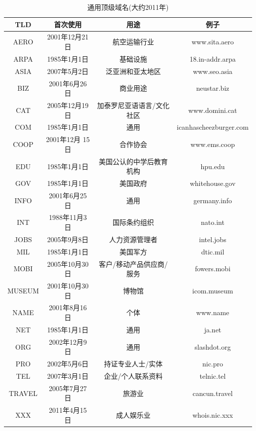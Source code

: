 \begin{table}[]
	\centering
	\caption{通用顶级域名(大约2011年)}
	\begin{tabular}{c|c|c|c}
		\hline
        TLD	    & 首次使用	    &     用途	          &              例子 \\ \hline
        AERO	& 2001年12月21日	& 航空运输行业	       &     www.sita.aero \\ \hline
        ARPA	& 1985年1月1日	& 基础设施	           &     18.in-addr.arpa \\ \hline
        ASIA	& 2007年5月2日	& 泛亚洲和亚太地区	       & www.seo.asia \\ \hline
        BIZ	    & 2001年6月26日	& 商业用途	          &      neustar.biz \\ \hline
        CAT	    & 2005年12月19日	& 加泰罗尼亚语语言/文化社区	&www.domini.cat \\ \hline
        COM	    & 1985年1月1日	& 通用	             &   icanhascheezburger.com \\ \hline
        COOP	& 2001年12月 15日	& 合作协会	        &        www.ems.coop \\ \hline
        EDU	    & 1985年1月1日	& 美国公认的中学后教育机构	   & hpu.edu \\ \hline
        GOV	    & 1985年1月1日	& 美国政府	           &     whitehouse.gov \\ \hline
        INFO	& 2001年6月25日	& 通用	            &        germany.info \\ \hline
        INT	    & 1988年11月3日	& 国际条约组织	        &    nato.int \\ \hline
        JOBS	& 2005年9月8日	& 人力资源管理者	        &    intel.jobs \\ \hline
        MIL	    & 1985年1月1日	& 美国军方	           &     dtic.mil \\ \hline
        MOBI	& 2005年10月30日	& 客户/移动产品供应商/服务	&fowers.mobi \\ \hline
        MUSEUM	& 2001年10月30日	& 博物馆	          &      icom.museum \\ \hline
        NAME	& 2001年8月16日	& 个体	            &    www.name \\ \hline
        NET	    & 1985年1月1日	& 通用	             &   ja.net \\ \hline
        ORG	    & 2002年12月9日	& 通用	            &    slashdot.org \\ \hline
        PRO	    & 2002年5月6日	& 持证专业人士/实体	      &  nic.pro \\ \hline
        TEL	    & 2007年3月1日	& 企业/个人联系资料	      &  telnic.tel \\ \hline
        TRAVEL	& 2005年7月27日	& 旅游业	           &     cancun.travel \\ \hline
        XXX	& 2011年4月15日	& 成人娱乐业	          &      whois.nic.xxx \\ \hline
	\end{tabular}
\end{table}

